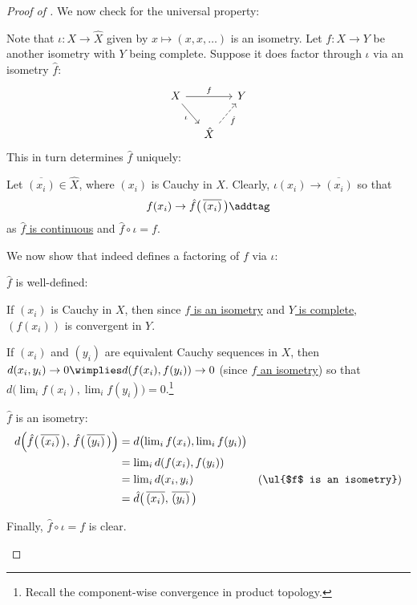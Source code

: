 \begin{proof}[Proof of ]
		\noindent We now check for the universal property:
		\begin{subproof}
			Note that $\iota\colon X\to\hat X$ given by $x\mapsto (x, x, \ldots)$ is an isometry. Let $f\colon X\to Y$ be another isometry with $Y$ being complete. Suppose it does factor through $\iota$ via an isometry $\hat f$:
			\[
			\begin{tikzcd}[column sep=small]
				X\ar[dr, "\iota"']\ar[rr, "f"] && Y\\
				& \hat X\ar[ur, dashed, "\hat f"'] &
			\end{tikzcd}
			\]
			This in turn determines $\hat f$ uniquely:
			\begin{subproof}
				Let $\overline{(x_i)}\in\hat X$, where $(x_i)$ is Cauchy in $X$. Clearly, $\iota(x_i)\to\overline{(x_i)}$ so that
				\[
				f(x_i)\to \hat f\bigl(\, \overline{(x_i)} \,\bigr) \addtag\label{EQN: metric completion proof}
				\]
				as \ul{$\hat f$ is continuous} and \ul{$\hat f\circ \iota = f$}.
			\end{subproof}
			We now show that  indeed defines a factoring of $f$ via $\iota$:
			\begin{prooflist}
				\item $\hat f$ is well-defined:
				\begin{rmklist}
					\item If $(x_i)$ is Cauchy in $X$, then since \ul{$f$ is an isometry} and \ul{$Y$ is complete}, $(f(x_i))$ is convergent in $Y$.
					
					\item If $(x_i)$ and $(y_i)$ are equivalent Cauchy sequences in $X$, then $d(x_i, y_i)\to 0\wimplies d(f(x_i), f(y_i))\to 0$ (since \ul{$f$ an isometry}) so that $d\bigl(\lim_i f(x_i), \lim_i f(y_i)\bigr) = 0$.\footnote{Recall the component-wise convergence in product topology.}
				\end{rmklist}
				
				\item $\hat f$ is an isometry:
				\begin{alignat*}{2}
					d\Bigl( \hat f\bigl(\, \overline{(x_i)} \,\bigr),\, \hat f\bigl(\, \overline{(y_i)} \,\bigr) \Bigr)
					& = d\bigl(\lim\nolimits_i f(x_i), \lim\nolimits_i f(y_i)\bigr)\\
					& = \lim\nolimits_i d(f(x_i), f(y_i))\\
					& = \lim\nolimits_i d(x_i, y_i) & \text{(\ul{$f$ is an isometry})}\\
					& = \hat d\bigl(\, \overline{(x_i)},\, \overline{(y_i)} \,\bigr)
				\end{alignat*}
				
				\item Finally, $\hat f\circ \iota = f$ is clear.\qedhere
			\end{prooflist}
		\end{subproof}
	\end{proof}
	

